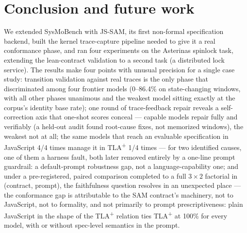 \documentclass[11pt]{article}
\newcommand{\jssam}{JS-SAM}
\newcommand{\tlaplus}{TLA\texorpdfstring{\textsuperscript{+}}{+}}
\begin{document}
\section{Conclusion and future work}
\label{sec:conclusion}

We extended SysMoBench with \jssam{}, its first non-formal specification
backend, built the kernel trace-capture pipeline needed to give it a real
conformance phase, and ran four experiments on the Asterinas spinlock task,
extending the lean-contract validation to a second task (a distributed
lock service).
The results make four points with unusual precision for a single case study:
transition validation against real traces is the only phase that
discriminated among four frontier models (0--86.4\% on state-changing
windows, with all other phases unanimous and the weakest model sitting
exactly at the corpus's identity base rate); one round of trace-feedback
repair reveals a
self-correction axis that one-shot scores conceal --- capable models repair
fully and verifiably (a held-out audit found root-cause fixes, not memorized
windows), the weakest not at all; the same
models that reach an evaluable specification in JavaScript 4/4 times manage
it in \tlaplus{} 1/4 times --- for two identified causes, one of them a
harness fault, both later removed entirely by a one-line prompt guardrail:
a default-prompt robustness gap, not a language-capability one; and
under a pre-registered, paired comparison completed to a full $3{\times}2$
factorial in (contract, prompt), the faithfulness question resolves in an
unexpected place --- the conformance gap is attributable to the SAM
contract's machinery, not to JavaScript, not to formality, and not primarily
to prompt prescriptiveness: plain JavaScript in the shape of the \tlaplus{}
relation ties \tlaplus{} at 100\% for every model, with or without
spec-level semantics in the prompt.
\end{document}
